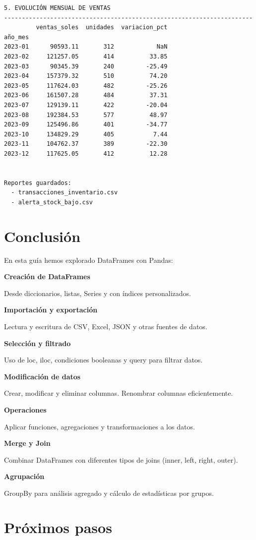 \documentclass[
  doc,
  floatsintext,
  longtable,
  a4paper,
  nolmodern,
  notxfonts,
  notimes,
  12pt,
  colorlinks=true,linkcolor=blue,citecolor=blue,urlcolor=blue]{apa7}
\begin{document}
\begin{verbatim}
5. EVOLUCIÓN MENSUAL DE VENTAS
----------------------------------------------------------------------
         ventas_soles  unidades  variacion_pct
año_mes                                       
2023-01      90593.11       312            NaN
2023-02     121257.05       414          33.85
2023-03      90345.39       240         -25.49
2023-04     157379.32       510          74.20
2023-05     117624.03       482         -25.26
2023-06     161507.28       484          37.31
2023-07     129139.11       422         -20.04
2023-08     192384.53       577          48.97
2023-09     125496.86       401         -34.77
2023-10     134829.29       405           7.44
2023-11     104762.37       389         -22.30
2023-12     117625.05       412          12.28


Reportes guardados:
  - transacciones_inventario.csv
  - alerta_stock_bajo.csv
\end{verbatim}

\section{Conclusión}\label{conclusiuxf3n}

En esta guía hemos explorado DataFrames con Pandas:

\textbf{Creación de DataFrames}

Desde diccionarios, listas, Series y con índices personalizados.

\textbf{Importación y exportación}

Lectura y escritura de CSV, Excel, JSON y otras fuentes de datos.

\textbf{Selección y filtrado}

Uso de loc, iloc, condiciones booleanas y query para filtrar datos.

\textbf{Modificación de datos}

Crear, modificar y eliminar columnas. Renombrar columnas eficientemente.

\textbf{Operaciones}

Aplicar funciones, agregaciones y transformaciones a los datos.

\textbf{Merge y Join}

Combinar DataFrames con diferentes tipos de joins (inner, left, right,
outer).

\textbf{Agrupación}

GroupBy para análisis agregado y cálculo de estadísticas por grupos.

\section{Próximos pasos}\label{pruxf3ximos-pasos}
\end{document}
